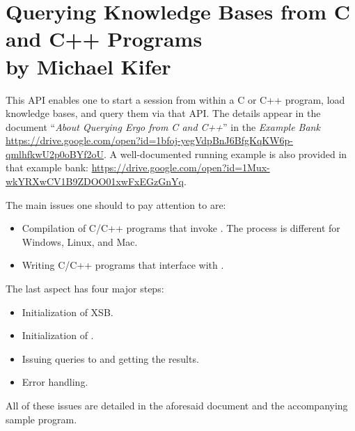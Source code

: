 \chapter[C and C++ Interface to \FLSYSTEM]{Querying
  Knowledge Bases from C and C++
  Programs\\{\Large by Michael Kifer}}

This API enables one to start a \FLSYSTEM session from within a C or C++
program, load knowledge bases, and query them via that API.
The details appear in the document
``\emph{About Querying Ergo from C and C++}'' in the \ERGOAI \emph{Example Bank}
\url{https://drive.google.com/open?id=1bfoj-yegVdpBnJ6BfgKqKW6p-qmlhfkwU2p0oBYf2oU}.
A well-documented running example is also provided in that example bank:
\url{https://drive.google.com/open?id=1Mux-wkYRXwCV1B9ZDOO01xwFxEGzGnYq}.

The main issues one should to pay attention to are: 
\begin{itemize}
\item  Compilation of C/C++ programs that invoke \FLSYSTEM. The process is
  different for Windows, Linux, and Mac.
\item Writing C/C++ programs that interface with \FLSYSTEM.
\end{itemize}
The last aspect has four major steps:
\begin{itemize}
\item  Initialization of XSB.
\item  Initialization of \FLSYSTEM.
\item  Issuing queries to \FLSYSTEM and getting the results.
\item  Error handling.
\end{itemize}

All of these issues are detailed in the aforesaid document and the
accompanying sample program.


